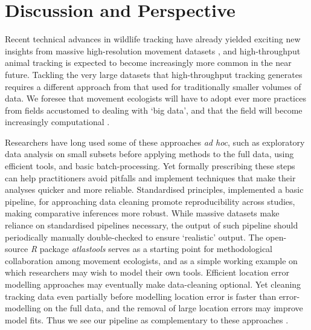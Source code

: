     \section*{Discussion and Perspective}

    Recent technical advances in wildlife tracking have already yielded exciting new insights from massive high-resolution movement datasets \citep{aspillaga2021, aspillaga2021a, baktoft2017, baktoft2019, harel2016, harel2018, oudman2018, papageorgiou2019, tsoar2011, strandburg-peshkin2015, toledo2020, beardsworth2021a, beardsworth2021b, corl2020, vilk2021, lourie2021}, and high-throughput animal tracking is expected to become increasingly more common in the near future.
    Tackling the very large datasets that high-throughput tracking generates requires a different approach from that used for traditionally smaller volumes of data.
    We foresee that movement ecologists will have to adopt ever more practices from fields accustomed to dealing with `big data', and that the field will become increasingly computational \citep{peng2011}.

    Researchers have long used some of these approaches \textit{ad hoc}, such as exploratory data analysis on small subsets before applying methods to the full data, using efficient tools, and basic batch-processing. 
    Yet formally prescribing these steps can help practitioners avoid pitfalls and implement techniques that make their analyses quicker and more reliable.
    Standardised principles, implemented a basic pipeline, for approaching data cleaning promote reproducibility across studies, making comparative inferences more robust.
    While massive datasets make reliance on standardised pipelines necessary, the output of such pipeline should periodically manually double-checked to ensure `realistic' output.
    The open-source \textit{R} package \textit{atlastools} serves as a starting point for methodological collaboration among movement ecologists, and as a simple working example on which researchers may wish to model their own tools.
    Efficient location error modelling approaches \citep{fleming2020, aspillaga2021} may eventually make data-cleaning optional.
    Yet cleaning tracking data even partially before modelling location error is faster than error-modelling on the full data, and the removal of large location errors may improve model fits.
    Thus we see our pipeline as complementary to these approaches \citep{fleming2014a, fleming2020}.

